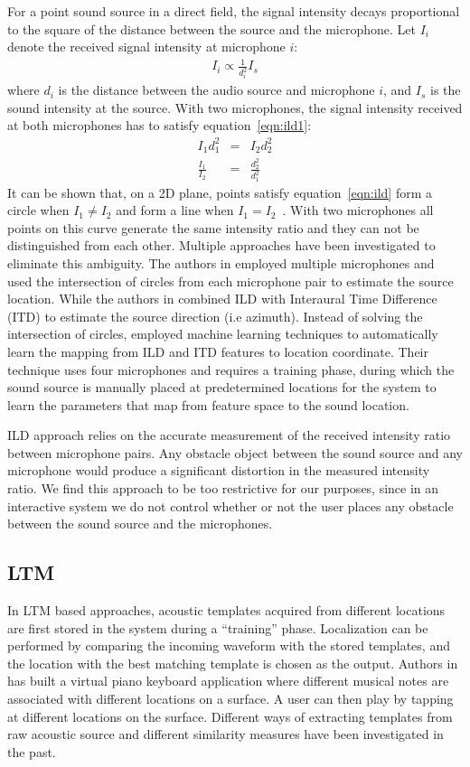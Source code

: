 For a point sound source in a direct field, the signal intensity decays proportional to the square of the distance between the source and the microphone. Let $I_i$ denote the received signal intensity at microphone $i$: 
\begin{eqnarray}\label{eqn:ild1}
I_i \propto \frac{1}{d_i^2} I_s
\end{eqnarray}
where $d_i$ is the distance between the audio source and microphone $i$, and $I_s$ is the sound intensity at the source.
With two microphones, the signal intensity received at both microphones has to satisfy equation~\ref{eqn:ild1}:
\begin{eqnarray}
I_1d_1^2 &=& I_2d_2^2\\
\label{eqn:ild}
\frac{I_1}{I_2} &=& \frac{d_2^2}{d_1^2}
\end{eqnarray}
It can be shown that, on a 2D plane, points satisfy equation~\ref{eqn:ild} form a circle when $I_1 \ne I_2$ and form a line when $I_1 = I_2$~\cite{ild:1}. With two microphones all points on this curve generate the same intensity ratio and they can not be distinguished from each other. Multiple approaches have been investigated to eliminate this ambiguity. The authors in \cite{ild:1} employed multiple microphones and used the intersection of circles from each microphone pair to estimate the source location. While the authors in \cite{ild:3} combined ILD with Interaural Time Difference (ITD) to estimate the source direction (i.e azimuth). Instead of solving the intersection of circles, \cite{ild:4} employed machine learning techniques to automatically learn the mapping from ILD and ITD features to location coordinate. Their technique uses four microphones and requires a training phase, during which the sound source is manually placed at predetermined locations for the system to learn the parameters that map from feature space to the sound location.

ILD approach relies on the accurate measurement of the received intensity ratio between microphone pairs. Any obstacle object between the sound source and any microphone would produce a significant distortion in the measured intensity ratio. We find this approach to be too restrictive for our purposes, since in an interactive system we do not control whether or not the user places any obstacle between the sound source and the microphones.

\subsection{LTM}
In LTM based approaches, acoustic templates acquired from different locations are first stored in the system during a ``training'' phase. Localization can be performed by comparing the incoming waveform with the stored templates, and the location with the best matching template is chosen as the output. Authors in \cite{extended:tusi} has built a virtual piano keyboard application where different musical notes are associated with different locations on a surface. A user can then play by tapping at different locations on the surface. Different ways of extracting templates from raw acoustic source and different similarity measures have been investigated in the past. 


